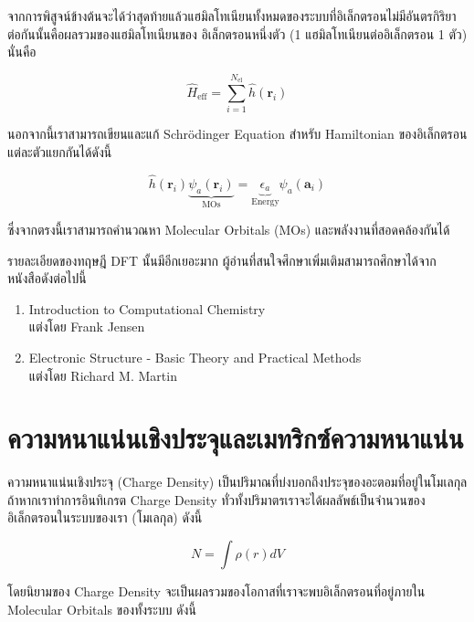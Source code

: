 จากการพิสูจน์ข้างต้นจะได้ว่าสุดท้ายแล้วแฮมิลโทเนียนทั้งหมดของระบบที่อิเล็กตรอนไม่มีอันตรกิริยาต่อกันนั้นคือผลรวมของแฮมิลโทเนียนของ%
อิเล็กตรอนหนึ่งตัว (1 แฮมิลโทเนียนต่ออิเล็กตรอน 1 ตัว) นั่นคือ 

\begin{equation}\label{eq:hamil_noninter_eff}
    \hat{H}_{\text{eff}} = \sum^{N_{\text{el}}}_{i=1} \hat{h}(\bm{r}_{i})
\end{equation}

นอกจากนี้เราสามารถเขียนและแก้ Schr\"{o}dinger Equation สำหรับ Hamiltonian ของอิเล็กตรอนแต่ละตัวแยกกันได้ดังนี้

\begin{equation}
    \hat{h}(\bm{r}_{i}) \underbrace{\psi_{a}(\bm{r}_{i})}_{\text{MOs}} = 
    \underbrace{\epsilon_{a}}_{\text{Energy}} \psi_{a}(\bm{a}_{i})
\end{equation}

\noindent ซึ่งจากตรงนี้เราสามารถคำนวณหา Molecular Orbitals (MOs) และพลังงานที่สอดคล้องกันได้

รายละเอียดของทฤษฎี DFT นั้นมีอีกเยอะมาก ผู้อ่านที่สนใจศึกษาเพิ่มเติมสามารถศึกษาได้จากหนังสือดังต่อไปนี้

\begin{enumerate}[topsep=0pt]
    \item Introduction to Computational Chemistry \\ แต่งโดย Frank Jensen
    
    \item Electronic Structure - Basic Theory and Practical Methods \\ แต่งโดย Richard M. Martin
\end{enumerate}

\section{ความหนาแน่นเชิงประจุและเมทริกซ์ความหนาแน่น}
\label{sec:charge_den}

ความหนาแน่นเชิงประจุ (Charge Density) เป็นปริมาณที่บ่งบอกถึงประจุของอะตอมที่อยู่ในโมเลกุล ถ้าหากเราทำการอินทิเกรต Charge Density 
ทั่วทั้งปริมาตรเราจะได้ผลลัพธ์เป็นจำนวนของอิเล็กตรอนในระบบของเรา (โมเลกุล) ดังนี้\autocite{szabo1996}

\begin{equation}
    N = \int \rho (r) dV
\end{equation}

โดยนิยามของ Charge Density จะเป็นผลรวมของโอกาสที่เราจะพบอิเล็กตรอนที่อยู่ภายใน Molecular Orbitals ของทั้งระบบ ดังนี้

